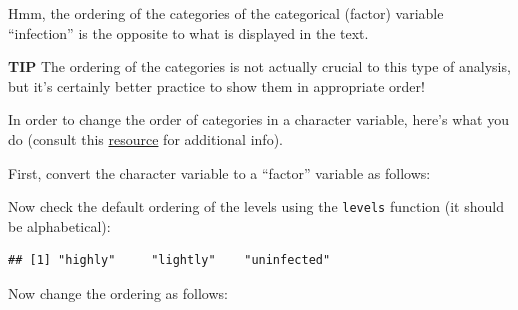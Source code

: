 \documentclass[
]{book}
\newenvironment{Shaded}{\begin{snugshade}}{\end{snugshade}}
\newcommand{\AttributeTok}[1]{\textcolor[rgb]{0.13,0.29,0.53}{#1}}
\newcommand{\FunctionTok}[1]{\textcolor[rgb]{0.13,0.29,0.53}{\textbf{#1}}}
\newcommand{\NormalTok}[1]{#1}
\newcommand{\OtherTok}[1]{\textcolor[rgb]{0.56,0.35,0.01}{#1}}
\newcommand{\SpecialCharTok}[1]{\textcolor[rgb]{0.81,0.36,0.00}{\textbf{#1}}}
\newcommand{\StringTok}[1]{\textcolor[rgb]{0.31,0.60,0.02}{#1}}
\begin{document}
Hmm, the ordering of the categories of the categorical (factor) variable ``infection'' is the opposite to what is displayed in the text.

\textbf{TIP }
The ordering of the categories is not actually crucial to this type of analysis, but it's certainly better practice to show them in appropriate order!

In order to change the order of categories in a character variable, here's what you do (consult this \href{http://www.cookbook-r.com/Manipulating_data/Changing_the_order_of_levels_of_a_factor/}{resource} for additional info).

First, convert the character variable to a ``factor'' variable as follows:

\begin{Shaded}
\end{Shaded}

Now check the default ordering of the levels using the \texttt{levels} function (it should be alphabetical):

\begin{Shaded}
\end{Shaded}

\begin{verbatim}
## [1] "highly"     "lightly"    "uninfected"
\end{verbatim}

Now change the ordering as follows:

\begin{Shaded}
\end{Shaded}
\end{document}
